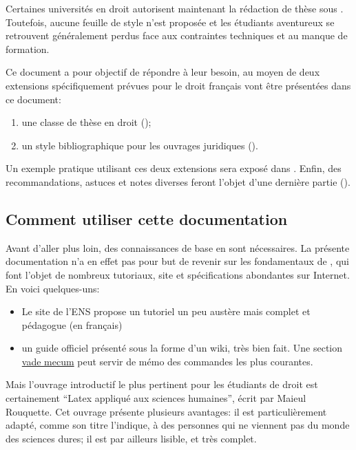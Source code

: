 \documentclass{ltxdockit}
\begin{document}
Certaines universités en droit autorisent maintenant la rédaction de thèse sous \latex. Toutefois, aucune feuille de style n'est proposée et les étudiants aventureux se retrouvent généralement perdus face aux contraintes techniques et au manque de formation.

Ce document a pour objectif de répondre à leur besoin, au moyen de deux extensions spécifiquement prévues pour le droit français vont être présentées dans ce document:
\begin{enumerate}
\item une classe \latex de thèse en droit ();
\item un style bibliographique pour les ouvrages juridiques ().
\end{enumerate}
Un exemple pratique utilisant ces deux extensions sera exposé dans . Enfin, des recommandations, astuces et notes diverses feront l'objet d'une dernière partie ().

\subsection{Comment utiliser cette documentation}

Avant d'aller plus loin, des connaissances de base en \latex sont nécessaires. La présente documentation n'a en effet pas pour but de revenir sur les fondamentaux de \latex, qui font l'objet de nombreux tutoriaux, site et spécifications abondantes sur Internet. En voici quelques-uns:
\begin{itemize}
\item Le site de l'ENS propose un tutoriel un peu austère mais complet et pédagogue (en français)
\item un guide officiel présenté sous la forme d'un wiki, très bien fait. Une section \href{http://fr.wikibooks.org/wiki/LaTeX/Vade_mecum#Structuration_du_document}{vade mecum} peut servir de mémo des commandes les plus courantes.
\end{itemize}

Mais l'ouvrage introductif le plus pertinent pour les étudiants de droit est certainement \enquote{Latex appliqué aux sciences humaines}, écrit par Maieul Rouquette. Cet ouvrage présente plusieurs avantages: il est particulièrement adapté, comme son titre l'indique, à des personnes qui ne viennent pas du monde des sciences dures; il est par ailleurs lisible, et très complet.
\end{document}
